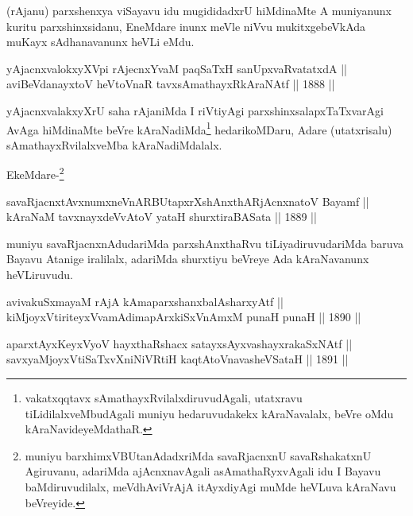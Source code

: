 \begin{artha}
(rAjanu) parxshenxya viSayavu idu mugididadxrU hiMdinaMte
A muniyanunx kuritu parxshinxsidanu, EneMdare inunx meVle niVvu
mukitxgebeVkAda muKayx sAdhanavanunx heVLi eMdu.
\end{artha}

\begin{shl}
yAjacnxvalokxyXV\s pi rAjecnxYvaM paqSaTxH sanUpxvaRvatatxdA || \\
aviBeVdanayxtoV heVtoVnaR tavxsAmathayxRkAraNAtf \hfill || 1888 ||
  
\end{shl}

\begin{artha}
yAjacnxvalakxyXrU saha rAjaniMda I riVtiyAgi parxshinxsalapxTaTxvarAgi
AvAga hiMdinaMte beVre kAraNadiMda\footnote{vakatxqqtavx
sAmathayxRvilalxdiruvudAgali, utatxravu tiLidilalxveMbudAgali muniyu
hedaruvudakekx kAraNavalalx, beVre oMdu kAraNavideyeMdathaR.} hedarikoMDaru, Adare
(utatxrisalu) sAmathayxRvilalxveMba kAraNadiMdalalx.

EkeMdare-\footnote{muniyu barxhimxVBUtanAdadxriMda savaRjacnxnU
savaRshakatxnU Agiruvanu, adariMda ajAcnxnavAgali asAmathaRyxvAgali
idu I Bayavu baMdiruvudilalx, meVdhAviVrAjA itAyxdiyAgi muMde
heVLuva kAraNavu beVreyide.}
\end{artha}

\begin{shl}
savaRjacnxtAvxnumxneVnARBUtapxrXshAnxthARjAcnxnatoV Bayamf ||  \\
kAraNaM tavxnayxdeVvAtoV yataH shurxtiraBASata \hfill || 1889 ||
  
\end{shl}

\begin{artha}
muniyu savaRjacnxnAdudariMda parxshAnxthaRvu tiLiyadiruvudariMda
baruva Bayavu Atanige iralilalx, adariMda shurxtiyu beVreye Ada
kAraNavanunx heVLiruvudu.
\end{artha}


\begin{shl}
avivakuSxmayaM rAjA kAmaparxshanxbalAsharxyAtf || \\
kiMjoyxVtiriteyxVvamAdimapArxkiSxVnAmxM punaH punaH \hfill || 1890 ||
  
\end{shl}

\begin{shl}
aparxtAyxKeyxVyoV hayxthaRshacx satayxsAyxvashayxrakaSxNAtf || \\
savxyaMjoyxVtiSaTxvXniNiVRtiH kaqtA\s toV\s navasheVSataH \hfill || 1891 ||
  
\end{shl}

